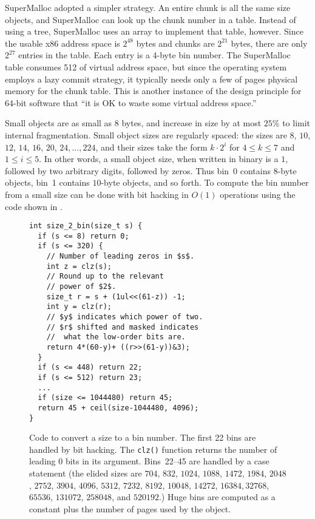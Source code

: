 \documentclass[natbib,sort&compress,10pt]{sigplanconf}
\newcommand{\code}[1]{\texttt{#1}}
\begin{document}
SuperMalloc adopted a simpler strategy.  An entire chunk is all the
same size objects, and SuperMalloc can look up the chunk number in a
table.  Instead of using a tree, SuperMalloc uses an array to
implement that table, however.  Since the usable x86 address space is
$2^{48}$ bytes and chunks are $2^{21}$ bytes, there are only $2^{27}$
entries in the table.  Each entry is a 4-byte bin number.  The
SuperMalloc table consumes \unit{512}\mebi\byte{} of virtual address
space, but since the operating system employs a lazy commit strategy,
it typically needs only a few of pages physical memory for the chunk
table.  This is another instance of the design principle for 64-bit
software that ``it is OK to waste some virtual address space.''


Small objects are as small as 8 bytes, and increase in size by at most
$25$\% to limit internal fragmentation.  Small object sizes are
regularly spaced: the sizes are $8$, $10$, $12$, $14$, $16$, $20$,
$24, \ldots, 224$, and their sizes take the form $k\cdot2^i$ for
$4\leq k \leq 7$ and $1\leq i \leq 5$.  In other words, a small object
size, when written in binary is a $1$, followed by two arbitrary
digits, followed by zeros.  Thus bin~$0$ contains $8$-byte objects,
bin~1 contains $10$-byte objects, and so forth.  To compute the bin
number from a small size can be done with bit hacking in $O(1)$
operations using the code shown in .

\begin{figure}
\begin{verbatim}
int size_2_bin(size_t s) {
  if (s <= 8) return 0;
  if (s <= 320) {
    // Number of leading zeros in $s$.
    int z = clz(s);
    // Round up to the relevant
    // power of $2$.
    size_t r = s + (1ul<<(61-z)) -1;
    int y = clz(r);
    // $y$ indicates which power of two.
    // $r$ shifted and masked indicates
    //  what the low-order bits are.
    return 4*(60-y)+ ((r>>(61-y))&3);
  }
  if (s <= 448) return 22;
  if (s <= 512) return 23;
  ...
  if (size <= 1044480) return 45;
  return 45 + ceil(size-1044480, 4096);
}
\end{verbatim}
\caption{Code to convert a size to a bin number.  The first 22 bins
  are handled by bit hacking. The \code{clz()} function returns the
  number of leading 0 bits in its argument. Bins~22--45 are handled by
  a case statement (the elided sizes are $704$, $832$, $1024$, $1088$,
  $1472$, $1984$, $2048$, $2752$, $3904$, $4096$, $5312$, $7232$,
  $8192$, $10048$, $14272$, $16384, 32768$, $65536$, $131072$,
  $258048$, and $520192$.)  Huge bins are computed as a constant plus
  the number of pages used by the object.}
\label{fig:size2bin}
\end{figure}
\end{document}
